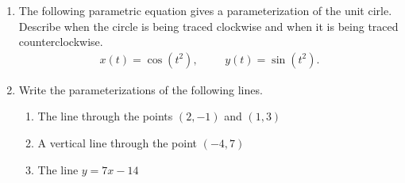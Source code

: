 \documentclass[12pt]{article}
\begin{document}
\drawtitle

\begin{enumerate}
\item The following parametric equation gives a parameterization of
  the unit cirle.  Describe when the circle is being traced clockwise
  and when it is being traced counterclockwise.
  \begin{align*}
    x(t)=\cos(t^2), &&& y(t)=\sin(t^2).
  \end{align*}

\item Write the parameterizations of the following lines.
  \begin{enumerate}
  \item The line through the points $(2,-1)$ and $(1,3)$
  \item A vertical line through the point $(-4, 7)$
  \item The line $y=7x-14$
  \end{enumerate}

\end{enumerate}
\end{document}
